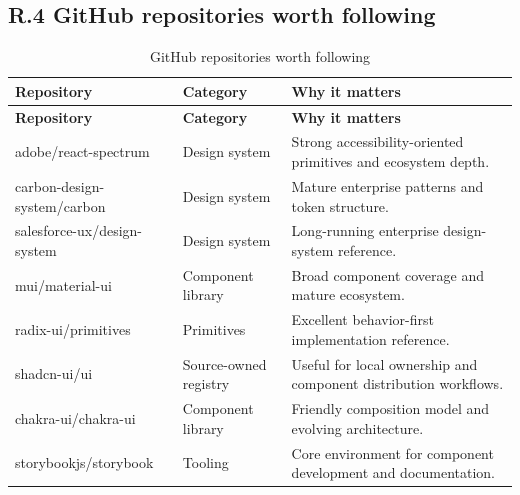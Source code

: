\subsection*{R.4 GitHub repositories worth following}
\begin{longtable}{@{}p{}p{}p{}@{}}
\caption{GitHub repositories worth following}\label{tab:bibliography-github}\\
\toprule
\textbf{Repository} & \textbf{Category} & \textbf{Why it matters} \\
\midrule
\endfirsthead
\toprule
\textbf{Repository} & \textbf{Category} & \textbf{Why it matters} \\
\midrule
\endhead
\bottomrule
\endfoot
adobe/react-spectrum & Design system & Strong accessibility-oriented primitives and ecosystem depth. \\
carbon-design-system/carbon & Design system & Mature enterprise patterns and token structure. \\
salesforce-ux/design-system & Design system & Long-running enterprise design-system reference. \\
mui/material-ui & Component library & Broad component coverage and mature ecosystem. \\
radix-ui/primitives & Primitives & Excellent behavior-first implementation reference. \\
shadcn-ui/ui & Source-owned registry & Useful for local ownership and component distribution workflows. \\
chakra-ui/chakra-ui & Component library & Friendly composition model and evolving architecture. \\
storybookjs/storybook & Tooling & Core environment for component development and documentation. \\
\end{longtable}

